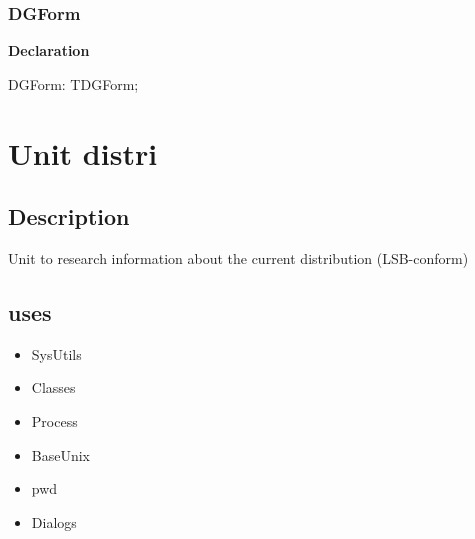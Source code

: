 \documentclass{report}
\newif\ifpdf
\begin{document}
\subsection*{DGForm}
\fi
\label{dgunit-DGForm}
\begin{list}{}{
\setlength{\itemindent}{0cm}
\setlength{\listparindent}{0cm}
\setlength{\leftmargin}{\evensidemargin}
\addtolength{\leftmargin}{\tmplength}
\settowidth{\labelsep}{X}
\addtolength{\leftmargin}{\labelsep}
\setlength{\labelwidth}{\tmplength}
}
\item[\textbf{Declaration}\hfill]
\ifpdf
\begin{flushleft}
\fi
\begin{ttfamily}
DGForm: TDGForm;\end{ttfamily}

\ifpdf
\end{flushleft}
\fi

\end{list}
\chapter{Unit distri}
\label{distri}
\section{Description}
Unit to research information about the current distribution (LSB{-}conform)
\section{uses}
\begin{itemize}
\item \begin{ttfamily}SysUtils\end{ttfamily}\item \begin{ttfamily}Classes\end{ttfamily}\item \begin{ttfamily}Process\end{ttfamily}\item \begin{ttfamily}BaseUnix\end{ttfamily}\item \begin{ttfamily}pwd\end{ttfamily}\item \begin{ttfamily}Dialogs\end{ttfamily}\end{itemize}
\end{document}
